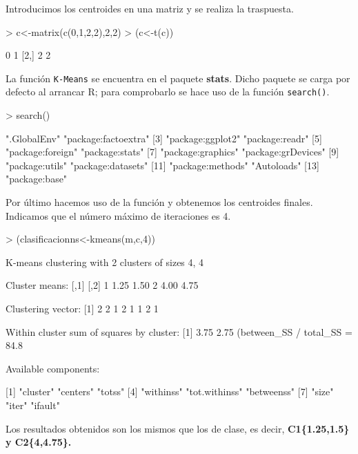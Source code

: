 \documentclass [a4paper] {article}
\begin{document}
\bigskip
Introducimos los centroides en una matriz y se realiza la traspuesta.
\begin{Schunk}
\begin{Sinput}
> c<-matrix(c(0,1,2,2),2,2)
> (c<-t(c))
\end{Sinput}
\begin{Soutput}
     [,1] [,2]
[1,]    0    1
[2,]    2    2
\end{Soutput}
\end{Schunk}

\bigskip
La función \texttt{K-Means} se encuentra en el paquete \textbf{stats}. Dicho paquete se carga por defecto al
arrancar R; para comprobarlo se hace uso de la función \texttt{search()}.
\begin{Schunk}
\begin{Sinput}
> search()
\end{Sinput}
\begin{Soutput}
 [1] ".GlobalEnv"         "package:factoextra"
 [3] "package:ggplot2"    "package:readr"     
 [5] "package:foreign"    "package:stats"     
 [7] "package:graphics"   "package:grDevices" 
 [9] "package:utils"      "package:datasets"  
[11] "package:methods"    "Autoloads"         
[13] "package:base"      
\end{Soutput}
\end{Schunk}

\bigskip
Por último hacemos uso de la función y obtenemos los centroides finales. Indicamos que el número máximo de
iteraciones es 4.
\begin{Schunk}
\begin{Sinput}
> (clasificacionns<-kmeans(m,c,4))
\end{Sinput}
\begin{Soutput}
K-means clustering with 2 clusters of sizes 4, 4

Cluster means:
  [,1] [,2]
1 1.25 1.50
2 4.00 4.75

Clustering vector:
[1] 2 2 1 2 1 1 2 1

Within cluster sum of squares by cluster:
[1] 3.75 2.75
 (between_SS / total_SS =  84.8 %

Available components:

[1] "cluster"      "centers"      "totss"       
[4] "withinss"     "tot.withinss" "betweenss"   
[7] "size"         "iter"         "ifault"      
\end{Soutput}
\end{Schunk}

\bigskip
Los resultados obtenidos son los mismos que los de clase, es decir, \textbf{C1\{1.25,1.5\} y C2\{4,4.75\}.}
\end{document}
